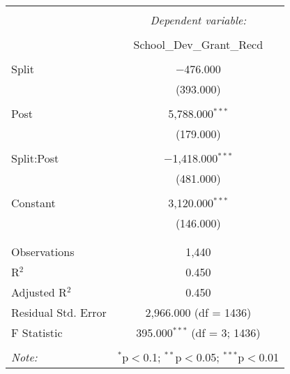 \documentclass[12pt, a4paper]{article}
\begin{document}
\begin{table}[!htbp] \centering 
  \caption{} 
  \label{} 
\begin{tabular}{@{\extracolsep{5pt}}lc} 
\\[-1.8ex]\hline 
\hline \\[-1.8ex] 
 & \multicolumn{1}{c}{\textit{Dependent variable:}} \\ 
\cline{2-2} 
\\[-1.8ex] & School\_Dev\_Grant\_Recd \\ 
\hline \\[-1.8ex] 
 Split & $-$476.000 \\ 
  & (393.000) \\ 
  & \\ 
 Post & 5,788.000$^{***}$ \\ 
  & (179.000) \\ 
  & \\ 
 Split:Post & $-$1,418.000$^{***}$ \\ 
  & (481.000) \\ 
  & \\ 
 Constant & 3,120.000$^{***}$ \\ 
  & (146.000) \\ 
  & \\ 
\hline \\[-1.8ex] 
Observations & 1,440 \\ 
R$^{2}$ & 0.450 \\ 
Adjusted R$^{2}$ & 0.450 \\ 
Residual Std. Error & 2,966.000 (df = 1436) \\ 
F Statistic & 395.000$^{***}$ (df = 3; 1436) \\ 
\hline 
\hline \\[-1.8ex] 
\textit{Note:}  & \multicolumn{1}{r}{$^{*}$p$<$0.1; $^{**}$p$<$0.05; $^{***}$p$<$0.01} \\ 
\end{tabular} 
\end{table} \clearpage
\end{document}

